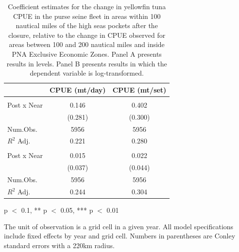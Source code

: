 \begin{table}
\centering
\begin{threeparttable}
\small
\caption{\label{tab:h3_reg_yft_ps}Coefficient estimates for the change in yellowfin tuna CPUE in the purse seine fleet in
             areas within 100 nautical miles of the high seas pockets after the closure, relative to the change in CPUE
             observed for areas between 100 and 200 nautical miles and inside PNA Exclusive Economic Zones.
             Panel A presents results in levels. Panel B presents results in which the dependent variable is log-transformed.}
\centering
\begin{tabular}[t]{lcc}
\toprule
  & CPUE (mt/day) & CPUE (mt/set)\\
\midrule
\addlinespace[0.5em]
\multicolumn{3}{l}{\textit{A) Levels}}\\
\midrule \hspace{1em}Post x Near & 0.146 & 0.402\\
\hspace{1em} & (0.281) & (0.300)\\
\hspace{1em}Num.Obs. & 5956 & \vphantom{1} 5956\\
\hspace{1em}$R^2$ Adj. & 0.221 & 0.280\\
\addlinespace[0.5em]
\multicolumn{3}{l}{\textit{B) Log-transformed}}\\
\midrule \hspace{1em}Post x Near & 0.015 & 0.022\\
\hspace{1em} & (0.037) & (0.044)\\
\hspace{1em}Num.Obs. & 5956 & 5956\\
\hspace{1em}$R^2$ Adj. & 0.244 & 0.304\\
\bottomrule
\end{tabular}
\begin{tablenotes}
\small
\item * p $<$ 0.1, ** p $<$ 0.05, *** p $<$ 0.01
\item The unit of observation is a grid cell in a given year. All model specifications include fixed effects by year and grid cell. Numbers in parentheses are Conley standard errors with a 220km radius.
\end{tablenotes}
\end{threeparttable}
\end{table}
